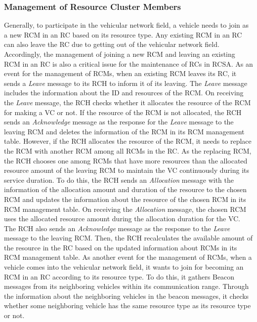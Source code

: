 \documentclass[sensors,article,accept,moreauthors,pdftex]{Definitions/mdpi}
\begin{document}
\subsubsection{Management of Resource Cluster Members}
Generally, to participate in the vehicular network field, a vehicle needs to join as a new RCM in an RC based on its resource type.
Any existing RCM in an RC can also leave the RC due to getting out of the vehicular network field.
Accordingly, the management of joining a new RCM and leaving an existing RCM in an RC is also a critical issue for the maintenance of RCs in RCSA.
As an event for the management of RCMs, when an existing RCM leaves its RC, it sends a \textit{Leave} message to its RCH to inform it of its leaving.
The \textit{Leave} message includes the information about the ID and resources of the RCM.
On receiving the \textit{Leave} message, the RCH checks whether it allocates the resource of the RCM for making a VC or not.
If the resource of the RCM is not allocated, the RCH sends an \textit{Acknowledge} message as the response for the \textit{Leave} message to the leaving RCM and deletes the information of the RCM in its RCM management table.
However, if the RCH allocates the resource of the RCM, it needs to replace the RCM with another RCM among all RCMs in the RC.
As the replacing RCM, the RCH chooses one among RCMs that have more resources than the allocated resource amount of the leaving RCM to maintain the VC continuously during its service duration.
To do this, the RCH sends an \textit{Allocation} message with the information of the allocation amount and duration of the resource to the chosen RCM and updates the information about the resource of the chosen RCM in its RCM management table.
On receiving the \textit{Allocation} message, the chosen RCM uses the allocated resource amount during the allocation duration for the VC.
The RCH also sends an \textit{Acknowledge} message as the response to the \textit{Leave} message to the leaving RCM.
Then, the RCH recalculates the available amount of the resource in the RC based on the updated information about RCMs in its RCM management table.
As another event for the management of RCMs, when a vehicle comes into the vehicular network field, it wants to join for becoming an RCM in an RC according to its resource type.
To do this, it gathers Beacon messages from its neighboring vehicles within its communication range.
Through the information about the neighboring vehicles in the beacon messages, it checks whether some neighboring vehicle has the same resource type as its resource type or not.
\end{document}
